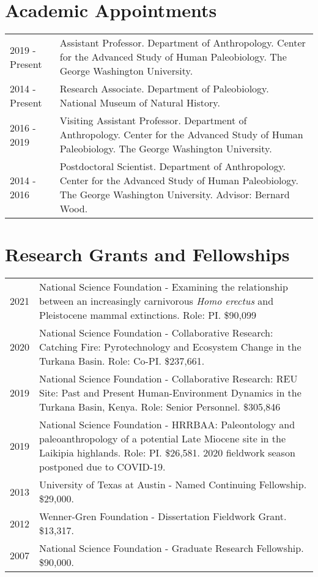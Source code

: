 \documentclass{article}
\begin{document}
\section*{Academic Appointments}
\begin{tabular}{p{}p{}}
2019 - Present & Assistant Professor. Department of Anthropology. Center for the Advanced Study of Human Paleobiology. The George Washington University.\\[4pt]
2014 - Present & Research Associate. Department of Paleobiology.  National Museum of Natural History.\\[4pt]
2016 - 2019 & Visiting Assistant Professor. Department of Anthropology. Center for the Advanced Study of Human Paleobiology. The George Washington University.\\[4pt]
2014 - 2016 & Postdoctoral Scientist. Department of Anthropology. Center for the Advanced Study of Human Paleobiology. The George Washington University. Advisor: Bernard Wood.\\[4pt]
\end{tabular} 




\section*{Research Grants and Fellowships}
\begin{tabular}{p{}p{}}
2021 & National Science Foundation - Examining the relationship between an increasingly carnivorous \emph{Homo erectus} and Pleistocene mammal extinctions. Role: PI. \$90,099\\[4pt]
2020 & National Science Foundation - Collaborative Research: Catching Fire: Pyrotechnology and Ecosystem Change in the Turkana Basin. Role: Co-PI. \$237,661.\\[4pt]
2019 &  National Science Foundation - Collaborative Research: REU Site: Past and Present Human-Environment Dynamics in the Turkana Basin, Kenya. Role: Senior Personnel. \$305,846\\[4pt]
2019 & National Science Foundation - HRRBAA: Paleontology and paleoanthropology of a potential Late Miocene site in the Laikipia highlands. Role: PI. \$26,581. 2020 fieldwork season postponed due to COVID-19. \\[4pt]
2013 &  University of Texas at Austin - Named Continuing Fellowship. \$29,000.\\[4pt]
2012  & Wenner-Gren Foundation - Dissertation Fieldwork Grant. \$13,317.\\[4pt]
2007 &  National Science Foundation - Graduate Research Fellowship. \$90,000.\\[4pt]

\end{tabular}
\end{document}

